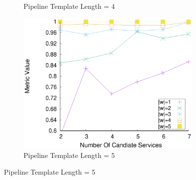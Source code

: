 \begin{figure}[ht!]
\begin{subfigure}{0.49\textwidth}
        \caption{Pipeline Template Length = 4}
        \label{fig:quality_window_wide_perce_n4}
      \end{subfigure}
      \hfill
      \begin{subfigure}{0.49\textwidth}
        \includegraphics[width=\textwidth]{Images/graphs/window_quality_performance_diff_perce_n7_s7_20_100_n5}
        \caption{Pipeline Template Length = 5}


\end{subfigure}
\end{figure}
